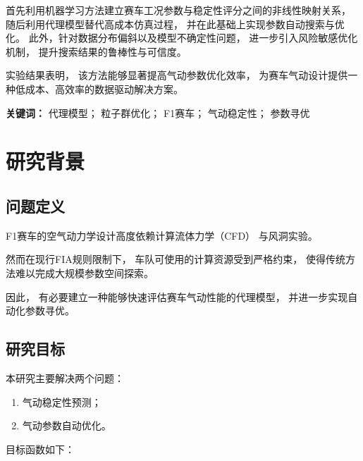 \documentclass[UTF8,12pt,a4paper]{ctexart}
\begin{document}
首先利用机器学习方法建立赛车工况参数与稳定性评分之间的非线性映射关系，
随后利用代理模型替代高成本仿真过程，
并在此基础上实现参数自动搜索与优化。
此外，针对数据分布偏斜以及模型不确定性问题，
进一步引入风险敏感优化机制，
提升搜索结果的鲁棒性与可信度。

实验结果表明，
该方法能够显著提高气动参数优化效率，
为赛车气动设计提供一种低成本、高效率的数据驱动解决方案。

\vspace{0.5cm}

\noindent
\textbf{关键词：}
代理模型；
粒子群优化；
F1赛车；
气动稳定性；
参数寻优

\newpage


\tableofcontents

\newpage



\section{研究背景}

\subsection{问题定义}

F1赛车的空气动力学设计高度依赖计算流体力学（CFD）
与风洞实验。

然而在现行FIA规则限制下，
车队可使用的计算资源受到严格约束，
使得传统方法难以完成大规模参数空间探索。

因此，
有必要建立一种能够快速评估赛车气动性能的代理模型，
并进一步实现自动化参数寻优。

\subsection{研究目标}

本研究主要解决两个问题：

\begin{enumerate}
    \item 气动稳定性预测；
    \item 气动参数自动优化。
\end{enumerate}

目标函数如下：
\end{document}
